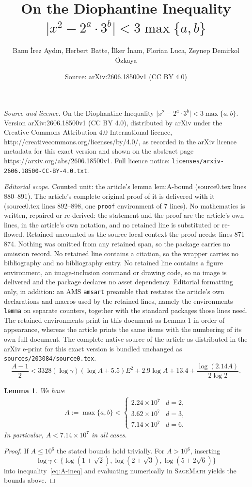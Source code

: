 \documentclass[10pt,a4paper]{amsart}
\title{On the Diophantine Inequality $\lvert x^{2} - 2^{a}\cdot 3^{b}\rvert < 3\max\{a,b\}$}
\author{Banu \.Irez Ayd{\i}n, Herbert Batte, \.Ilker \.Inam, Florian Luca, Zeynep Demirkol \"Ozkaya}
\date{Source: arXiv:2606.18500v1 (CC BY 4.0)}
\newtheorem{lemma}{Lemma}
\begin{document}
\maketitle

\noindent\emph{Source and licence.} On the Diophantine Inequality $\lvert x^{2} - 2^{a}\cdot 3^{b}\rvert < 3\max\{a,b\}$. Version arXiv:2606.18500v1 (CC BY 4.0), distributed by arXiv under the Creative Commons Attribution 4.0 International licence, http://creativecommons.org/licenses/by/4.0/, as recorded in the arXiv licence metadata for this exact version and shown on the abstract page https://arxiv.org/abs/2606.18500v1. Full licence notice: \texttt{licenses/arxiv-2606.18500-CC-BY-4.0.txt}.\par\smallskip

\noindent\textit{Editorial scope.} Counted unit: the article's lemma lem:A-bound (source0.tex lines 880--891). The article's complete original proof of it is delivered with it (source0.tex lines 892--898, one \texttt{proof} environment of 7 lines). No mathematics is written, repaired or re-derived: the statement and the proof are the article's own lines, in the article's own notation, and no retained line is substituted or re-flowed.  Retained uncounted as the source-local context the proof needs: lines 871--874.  Nothing was omitted from any retained span, so the package carries no omission record.  No retained line contains a citation, so the wrapper carries no bibliography and no bibliography entry.  No retained line contains a figure environment, an image-inclusion command or drawing code, so no image is delivered and the package declares no asset dependency.  Editorial formatting only, in addition: an AMS \texttt{amsart} preamble that restates the article's own declarations and macros used by the retained lines, namely the environments \texttt{lemma} on separate counters, together with the standard packages those lines need.  The retained environments print in this document as Lemma 1 in order of appearance, whereas the article prints the same items with the numbering of its own full document.  The complete native source of the article as distributed in the arXiv e-print for this exact version is bundled unchanged as \texttt{sources/203084/source0.tex}.
\begin{equation}\label{eq:A-ineq}
	\frac{A-1}{2}
	< 3328(\log\gamma)(\log A+5.5)E^2+2.9\log A+13.4	+ \frac{\log(2.14A)}{2\log 2}.
\end{equation}

\begin{lemma}\label{lem:A-bound}
	We have
	\begin{align*}
		A := \max\{a,b\} <
		\begin{cases}
			 2.24\times 10^7 & d = 2, \\
			3.62\times 10^7 & d = 3, \\
			7.14\times 10^7 & d = 6.
		\end{cases}
	\end{align*}
	In particular, $A < 7.14\times 10^7$ in all cases.
\end{lemma}

\begin{proof}
	If $A \leq 10^6$ the stated bounds hold trivially. For $A > 10^6$,
	inserting 
	$$\log\gamma \in \{\log(1+\sqrt{2}), \log(2+\sqrt{3}),
	\log(5+2\sqrt{6})\}$$ into inequality~\eqref{eq:A-ineq} and evaluating
	numerically in \textsc{SageMath} yields the bounds above.
\end{proof}
\end{document}
